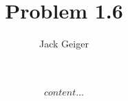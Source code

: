 \documentclass[fleqn,leqno,twocolumn]{article}
\begin{document}
	\title{Problem 1.6}
	\author{Jack Geiger}
	\maketitle
	\begin{equation}
		content...
	\end{equation}
\end{document}
